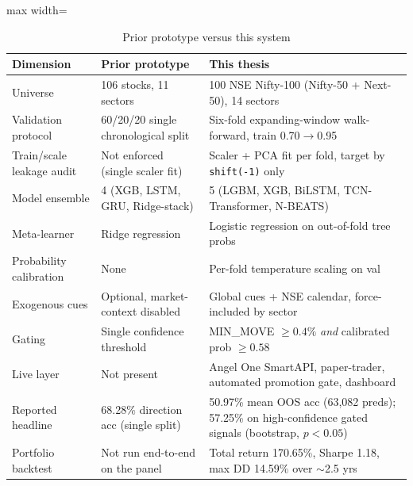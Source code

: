 \begin{table}[H]
\centering
\caption{Prior prototype versus this system}
\label{tab:prior_vs_this}
\renewcommand{\arraystretch}{1.35}
\begin{adjustbox}{max width=\textwidth}
\begin{tabular}{l l l}
\toprule
\textbf{Dimension} & \textbf{Prior prototype} & \textbf{This thesis} \\
\midrule
Universe                  & 106 stocks, 11 sectors                                    & 100 NSE Nifty-100 (Nifty-50 + Next-50), 14 sectors \\
Validation protocol       & 60/20/20 single chronological split                        & Six-fold expanding-window walk-forward, train 0.70$\to$0.95 \\
Train/scale leakage audit & Not enforced (single scaler fit)                          & Scaler + PCA fit per fold, target by \texttt{shift(-1)} only \\
Model ensemble            & 4 (XGB, LSTM, GRU, Ridge-stack)                            & 5 (LGBM, XGB, BiLSTM, TCN-Transformer, N-BEATS) \\
Meta-learner              & Ridge regression                                          & Logistic regression on out-of-fold tree probs \\
Probability calibration   & None                                                      & Per-fold temperature scaling on val \\
Exogenous cues            & Optional, market-context disabled                          & Global cues + NSE calendar, force-included by sector \\
Gating                    & Single confidence threshold                               & MIN\_MOVE $\geq 0.4\%$ \emph{and} calibrated prob $\geq 0.58$ \\
Live layer                & Not present                                               & Angel One SmartAPI, paper-trader, automated promotion gate, dashboard \\
Reported headline         & 68.28\% direction acc (single split)                       & 50.97\% mean OOS acc (63{,}082 preds); 57.25\% on high-confidence gated signals (bootstrap, $p<0.05$) \\
Portfolio backtest        & Not run end-to-end on the panel                            & Total return 170.65\%, Sharpe 1.18, max DD 14.59\% over $\sim$2.5 yrs \\
\bottomrule
\end{tabular}
\end{adjustbox}
\end{table}

